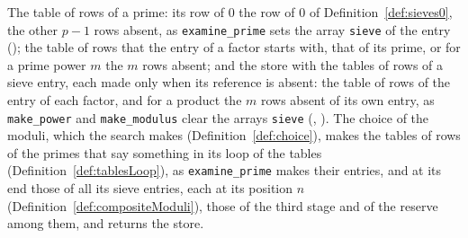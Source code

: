 \begin{definition}\label{def:storeTables}
  \leanok
  The table of rows of a prime: its row of $0$ the row of $0$ of Definition~\ref{def:sieves0}, the
  other $p - 1$ rows absent, as \verb|examine_prime| sets the array \verb|sieve| of the entry
  (); the table of rows that the entry of a factor starts with,
  that of its prime, or for a prime power $m$ the $m$ rows absent; and the store with the tables of
  rows of a sieve entry, each made only when its reference is absent: the table of rows of the entry
  of each factor, and for a product the $m$ rows absent of its own entry, as \verb|make_power| and
  \verb|make_modulus| clear the arrays \verb|sieve| (,
  ). The choice of the moduli, which the search makes
  (Definition~\ref{def:choice}), makes the tables of rows of the primes that say something in its
  loop of the tables (Definition~\ref{def:tablesLoop}), as \verb|examine_prime| makes their entries,
  and at its end those of all its sieve entries, each at its position $n$
  (Definition~\ref{def:compositeModuli}), those of the third stage and of the reserve among them,
  and returns the store.
\end{definition}


